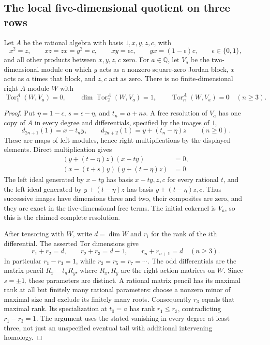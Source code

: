 \subsection{The local five-dimensional quotient on three rows}

\begin{lemma}
\label{C:drifting-pencil-Tor}
Let $A$ be the rational algebra with basis $1,x,y,z,c$, with
\[
 x^2=z,\qquad xz=zx=y^2=c,\qquad
 xy=\epsilon c,\qquad yx=(1-\epsilon)c,
 \qquad \epsilon\in\{0,1\},
\]
and all other products between $x,y,z,c$ zero.
For $a\in\mathbb Q$, let $V_a$ be the two-dimensional module
on which $y$ acts as a nonzero square-zero Jordan block, $x$
acts as $a$ times that block, and $z,c$ act as zero.
There is no finite-dimensional right $A$-module $W$ with
\[
 \operatorname{Tor}_1^A(W,V_a)=0,\qquad
 \dim\operatorname{Tor}_2^A(W,V_a)=1,\qquad
 \operatorname{Tor}_n^A(W,V_a)=0\quad(n\geq3).
\]
\end{lemma}
\begin{proof}
Put $\eta=1-\epsilon$, $s=\epsilon-\eta$, and
$t_n=a+ns$.  A free resolution of $V_a$ has one copy of $A$
in every degree and differentials, specified by the images of $1$,
\[
 d_{2n+1}(1)=x-t_ny,\qquad
 d_{2n+2}(1)=y+(t_n-\eta)z\qquad(n\geq0).
\]
These are maps of left modules, hence right multiplications by
the displayed elements.  Direct multiplication gives
\begin{align*}
 (y+(t-\eta)z)(x-ty)&=0,\\
 (x-(t+s)y)(y+(t-\eta)z)&=0.
\end{align*}
The left ideal generated by $x-ty$ has basis
$x-ty,z,c$ for every rational $t$, and the left ideal generated
by $y+(t-\eta)z$ has basis $y+(t-\eta)z,c$.
Thus successive images have dimensions three and two, their
composites are zero, and they are exact in the five-dimensional
free terms.  The initial cokernel is $V_a$, so this is the
claimed complete resolution.

After tensoring with $W$, write $d=\dim W$ and $r_i$ for the
rank of the $i$th differential.  The asserted Tor dimensions
give
\[
 r_1+r_2=d,\qquad r_2+r_3=d-1,
 \qquad r_n+r_{n+1}=d\quad(n\geq3).
\]
In particular $r_1-r_3=1$, while
$r_3=r_5=r_7=\cdots$.
The odd differentials are the matrix pencil
$R_x-t_nR_y$, where $R_x,R_y$ are the right-action matrices
on $W$.  Since $s=\pm1$, these parameters are distinct.
A rational matrix pencil has its maximal rank at all but
finitely many rational parameters: choose a nonzero minor of
maximal size and exclude its finitely many roots.
Consequently $r_3$ equals that maximal rank.  Its specialization
at $t_0=a$ has rank $r_1\leq r_3$, contradicting $r_1-r_3=1$.
The argument uses the stated vanishing in every degree at least
three, not just an unspecified eventual tail with additional
intervening homology.
\end{proof}

